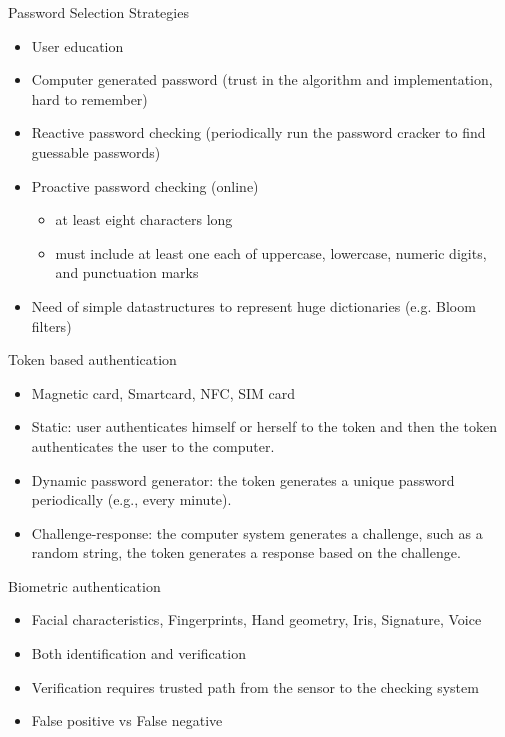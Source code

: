 \documentclass{beamer}
\begin{document}
\begin{frame}{Password Selection Strategies }
  \begin{itemize}
    \item User education 
    \item Computer generated password (trust in the algorithm and implementation, hard to remember)
    \item Reactive password checking (periodically run the password cracker to find guessable passwords)
    \item Proactive password checking (online)
      \begin{itemize}
        \item at least eight characters long
        \item must include at least one each of uppercase, lowercase, numeric digits, and punctuation marks
      \end{itemize}
    \item Need of simple datastructures to represent huge dictionaries (e.g. Bloom filters) 
  \end{itemize}
\end{frame}

\begin{frame}{Token based authentication}
  \begin{itemize}
    \item Magnetic card, Smartcard, NFC, SIM card 
    \item Static: user authenticates himself or herself
      to the token and then the token authenticates the user to the computer.
    \item Dynamic password generator: the token generates a unique
      password periodically (e.g., every minute).
    \item Challenge-response: the computer system generates a challenge,
      such as a random string, the token generates a
      response based on the challenge.
  \end{itemize}
\end{frame}

\begin{frame}{Biometric authentication}
  \begin{itemize}
    \item Facial characteristics, Fingerprints, Hand geometry, Iris, Signature, Voice 
    \item Both identification and verification
    \item Verification requires trusted path from the sensor to the checking system
    \item False positive vs False negative
  \end{itemize}
\end{frame}
\end{document}

